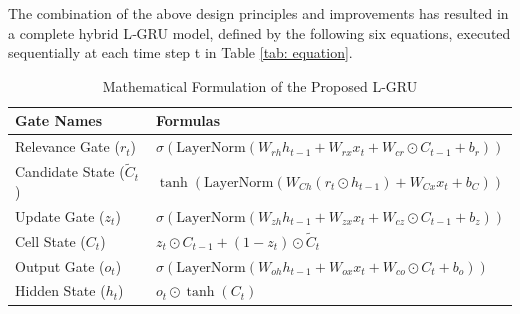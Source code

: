 \documentclass{cys}
\begin{document}
  The combination of the above design principles and improvements has resulted in a complete hybrid L‑GRU model, defined by the following six equations, executed sequentially at each time step t in Table \ref{tab: equation}.

\begin{table}[h!]
\centering
\caption{Mathematical Formulation of the Proposed L-GRU}
\begin{tabular}{|l|l|}
\hline
\textbf{Gate Names} & \textbf{Formulas} \\
\hline
Relevance Gate ($r_t$) 
& $ \sigma\!\left(\mathrm{LayerNorm}\left(W_{rh} h_{t-1} + W_{rx} x_t + W_{cr} \odot C_{t-1} + b_r\right)\right) $ \\

Candidate State ($\tilde{C}_t$) 
& $ \tanh\!\left(\mathrm{LayerNorm}\left(W_{Ch} (r_t \odot h_{t-1}) + W_{Cx} x_t + b_C\right)\right) $ \\

Update Gate ($z_t$) 
& $ \sigma\!\left(\mathrm{LayerNorm}\left(W_{zh} h_{t-1} + W_{zx} x_t + W_{cz} \odot C_{t-1} + b_z\right)\right) $ \\

Cell State ($C_t$) 
& $ z_t \odot C_{t-1} + (1 - z_t) \odot \tilde{C}_t $ \\

Output Gate ($o_t$) 
& $ \sigma\!\left(\mathrm{LayerNorm}\left(W_{oh} h_{t-1} + W_{ox} x_t + W_{co} \odot C_t + b_o\right)\right) $ \\

Hidden State ($h_t$) 
& $ o_t \odot \tanh(C_t) $ \\
\hline
\end{tabular}
\label{tab:equation}
\end{table}




\end{document}

